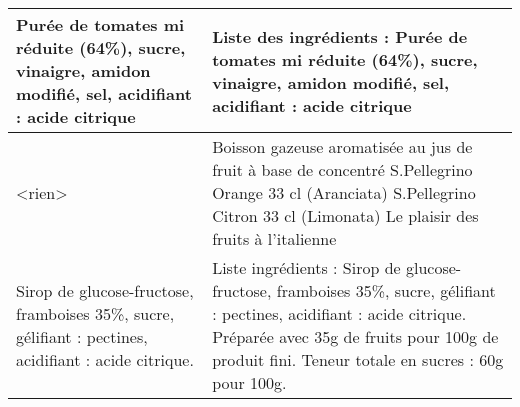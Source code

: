 \begin{longtable}{p{7cm}p{7cm}}
                                                                                                                                                                                                   Purée de tomates mi réduite (64\%), sucre, vinaigre, amidon modifié, sel, acidifiant : acide citrique &                                                                                                                                                                                                                                                                                                                                         Liste des ingrédients :  Purée de tomates mi réduite (64\%), sucre, vinaigre, amidon modifié, sel, acidifiant :  \newline acide citrique \\ \hline
                                                                                                                                                                                                                                                                                                 <rien> &                                                                                                                                                                                                                                                                                        Boisson gazeuse aromatisée au jus de fruit à base de concentré \newline S.Pellegrino Orange 33 cl (Aranciata) \newline S.Pellegrino Citron 33 cl (Limonata) \newline Le plaisir des fruits à l’italienne \\ \hline
                                                                                                                                                                                                   Sirop de glucose-fructose, framboises 35\%, sucre, gélifiant : pectines, acidifiant : acide citrique. &                                                                                                                                                                                                                                           Liste ingrédients : Sirop de glucose-fructose, framboises 35\%, sucre, gélifiant : pectines, acidifiant :  \newline acide citrique. \newline Préparée avec 35g de fruits pour 100g de produit fini.  \newline Teneur totale en sucres : 60g pour 100g. \\ \hline

\end{longtable}
